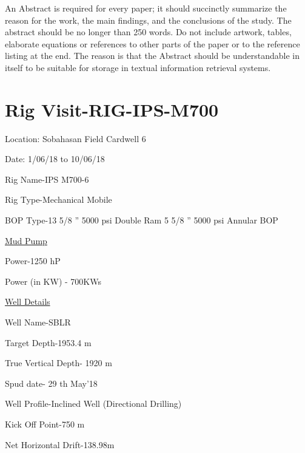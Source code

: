\documentclass[11pt,a4paper]{article}
\makeatletter
\newcommand\mainmatter{%
    \cleardoublepage
  \pagenumbering{arabic}}
\makeatother
\begin{document}
\vspace{2em}
  
An Abstract is required for every paper; it should succinctly summarize the reason for the work, the main findings, and the conclusions of the study. The abstract should be no longer than 250 words. Do not include artwork, tables, elaborate equations or references to other parts of the paper or to the reference listing at the end. The reason is that the Abstract should be understandable in itself to be suitable for storage in textual information retrieval systems.
  
\newpage


\listoftables


\newpage


\listoffigures


\newpage

\mainmatter

\newpage









\section{\textbf{Rig Visit-RIG-IPS-M700}}

Location: Sobahasan Field Cardwell 6

Date: 1/06/18 to 10/06/18

Rig Name-IPS M700-6

Rig Type-Mechanical Mobile

BOP Type-13 5/8 ” 5000 psi Double Ram \hfill 5 5/8 ” 5000 psi Annular BOP

\underline{Mud Pump}

Power-1250 hP

Power (in KW) - 700KWs

\underline{Well Details}

Well Name-SBLR

Target Depth-1953.4 m

True Vertical Depth- 1920 m

Spud date- 29 th May’18

Well Profile-Inclined Well (Directional Drilling)

Kick Off Point-750 m

Net Horizontal Drift-138.98m
\end{document}
